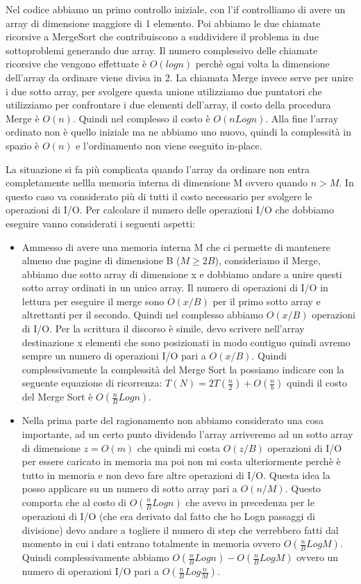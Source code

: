 \documentclass[14pt]{extreport}
\begin{document}
Nel codice abbiamo un primo controllo iniziale, con l'if controlliamo di avere un array di dimensione maggiore di 1 elemento. Poi abbiamo le due chiamate ricorsive a MergeSort che contribuiscono a suddividere il problema in due sottoproblemi generando due array. Il numero complessivo delle chiamate ricorsive che vengono effettuate è $O(log n)$ perchè ogni volta la dimensione dell'array da ordinare viene divisa in 2.
La chiamata Merge invece serve per unire i due sotto array, per svolgere questa unione utilizziamo due puntatori che utilizziamo per confrontare i due elementi dell'array, il costo della procedura Merge è $O(n)$. Quindi nel complesso il costo è $O(nLogn)$.
Alla fine l'array ordinato non è quello iniziale ma ne abbiamo uno nuovo, quindi la complessità in spazio è $O(n)$ e l'ordinamento non viene eseguito in-place.

La situazione si fa più complicata quando l'array da ordinare non entra completamente nellla memoria interna di dimensione M ovvero quando $n>M$.
In questo caso va considerato più di tutti il costo necessario per svolgere le operazioni di I/O.
Per calcolare il numero delle operazioni I/O che dobbiamo eseguire vanno considerati i seguenti aspetti:
\begin{itemize}
    \item Ammesso di avere una memoria interna M che ci permette di mantenere almeno due pagine di dimensione B ($M \geq 2B$), consideriamo il Merge, abbiamo due sotto array di dimensione x e dobbiamo andare a unire questi sotto array ordinati in un unico array.
    Il numero di operazioni di I/O in lettura per eseguire il merge sono $O(x/B)$ per il primo sotto array e altrettanti per il secondo. Quindi nel complesso abbiamo $O(x/B)$ operazioni di I/O.
    Per la scrittura il discorso è simile, devo scrivere nell'array destinazione x elementi che sono posizionati in modo contiguo quindi avremo sempre un numero di operazioni I/O pari a $O(x/B)$.
    Quindi complessivamente la complessità del Merge Sort la possiamo indicare con la seguente equazione di ricorrenza: $T(N) = 2T(\frac{n}{2}) + O(\frac{n}{b})$ quindi il costo del Merge Sort è $O(\frac{n}{B}Logn)$.
    \item Nella prima parte del ragionamento non abbiamo considerato una cosa importante, ad un certo punto dividendo l'array arriveremo ad un sotto array di dimensione $z = O(m)$ che quindi mi costa $O(z/B)$ operazioni di I/O per essere caricato in memoria ma poi non mi costa ulteriormente perchè è tutto in memoria e non devo fare altre operazioni di I/O.
    Questa idea la posso applicare su un numero di sotto array pari a $O(n/M)$. 
    Questo comporta che al costo di $O(\frac{n}{B}Logn)$ che avevo in precedenza per le operazioni di I/O (che era derivato dal fatto che ho Logn passaggi di divisione) devo andare a togliere il numero di step che verrebbero fatti dal momento in cui i dati entrano totalmente in memoria ovvero $O(\frac{n}{B}LogM)$.
    Quindi complessivamente abbiamo $O(\frac{n}{B}Logn) - O(\frac{n}{B}LogM)$ ovvero un numero di operazioni I/O pari a $O(\frac{n}{B}Log\frac{n}{M})$.
\end{itemize}
\end{document}
